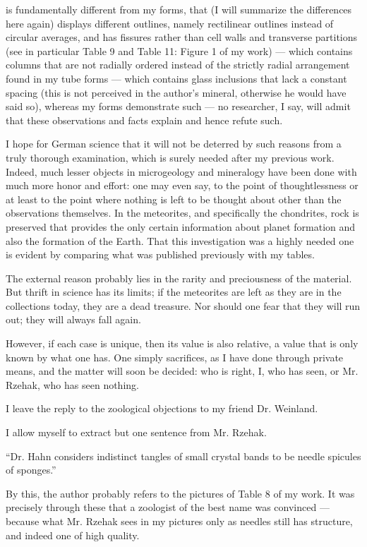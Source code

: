 \documentclass[a4paper, 12pt, oneside]{article}
\begin{document}
is fundamentally different from my forms, that (I will summarize the differences here again) displays different outlines, namely rectilinear outlines instead of circular averages, and has fissures rather than cell walls and transverse partitions (see in particular Table 9 and Table 11: Figure 1 of my work) --- which contains columns that are not radially ordered instead of the strictly radial arrangement found in my tube forms --- which contains glass inclusions that lack a constant spacing (this is not perceived in the author's mineral, otherwise he would have said so), whereas my forms demonstrate such --- no researcher, I say, will admit that these observations and facts explain and hence refute such.

I hope for German science that it will not be deterred by such reasons from a truly thorough examination, which is surely needed after my previous work. Indeed, much lesser objects in microgeology and mineralogy have been done with much more honor and effort: one may even say, to the point of thoughtlessness or at least to the point where nothing is left to be thought about other than the observations themselves. In the meteorites, and specifically the chondrites, rock is preserved that provides the only certain information about planet formation and also the formation of the Earth. That this investigation was a highly needed one is evident by comparing what was published previously with my tables.

The external reason probably lies in the rarity and preciousness of the material. But thrift in science has its limits; if the meteorites are left as they are in the collections today, they are a dead treasure. Nor should one fear that they will run out; they will always fall again.

However, if each case is unique, then its value is also relative, a value that is only known by what one has. One simply sacrifices, as I have done through private means, and the matter will soon be decided: who is right, I, who has seen, or Mr. Rzehak, who has seen nothing.

I leave the reply to the zoological objections to my friend Dr. Weinland.

I allow myself to extract but one sentence from Mr. Rzehak.

``Dr. Hahn considers indistinct tangles of small crystal bands to be needle spicules of sponges.''

By this, the author probably refers to the pictures of Table 8 of my work. It was precisely through these that a zoologist of the best name was convinced --- because what Mr. Rzehak sees in my pictures only as needles still has structure, and indeed one of high quality.
\end{document}

